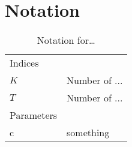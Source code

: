 \chapter*{Notation}
\label{ch:notation}

\begin{table}
    \caption{Notation for\ldots}
    \begin{tabularx}{\textwidth}{@{}XX@{}}
        \toprule
        Indices \\
        $K$ & Number of ... \\
        $T$ & Number of ... \\
        Parameters \\
        c   & something \\
        \bottomrule
    \end{tabularx}
\end{table}